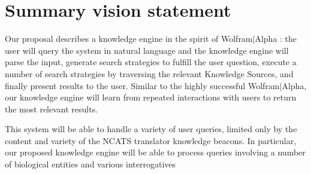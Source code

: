 \documentclass[11pt,notitlepage]{article}
\begin{document}
\thispagestyle{plain}

\section{Summary vision statement}
Our proposal describes a knowledge engine in the spirit of Wolfram$|$Alpha \cite{Wolframalpha}: the user will query the system in natural language and the knowledge engine will parse the input, generate search strategies to fulfill the user question, execute a number of search strategies by traversing the relevant Knowledge Sources, and finally present results to the user. Similar to the highly successful Wolfram$|$Alpha, our knowledge engine will learn from repeated interactions with users to return the most relevant results. 

This system will be able to handle a variety of user queries, limited only by the content and variety of the NCATS translator knowledge beacons. In particular, our proposed knowledge engine will be able to process queries involving a number of biological entities and various interrogatives 
\end{document}
